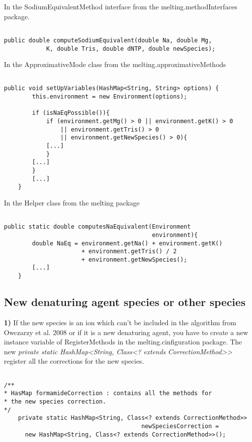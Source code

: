 \documentclass{article}
\begin{document}
In the SodiumEquivalentMethod interface from the melting.methodInterfaces package.
\begin{verbatim}

public double computeSodiumEquivalent(double Na, double Mg, 
            K, double Tris, double dNTP, double newSpecies);

\end{verbatim}

In the ApproximativeMode class from the melting.approximativeMethods
\begin{verbatim}

public void setUpVariables(HashMap<String, String> options) {
		this.environment = new Environment(options);

		if (isNaEqPossible()){
			if (environment.getMg() > 0 || environment.getK() > 0 
			    || environment.getTris() > 0 
			    || environment.getNewSpecies() > 0){
			[...]
			}
		[...]
		}
		[...]
	}

\end{verbatim}

In the Helper class from the melting package
\begin{verbatim}

public static double computesNaEquivalent(Environment 
                                          environment){
		double NaEq = environment.getNa() + environment.getK() 
		              + environment.getTris() / 2 
		              + environment.getNewSpecies();
		[...]
	}

\end{verbatim}

\subsection{New denaturing agent species or other species}

\textbf{1)} If the new species is an ion which can't be included in the algorithm from Owczarzy et al. 2008
or if it is a new denaturing agent, you have to create a new instance variable of RegisterMethods in
the melting.cinfiguration package. The new \textit{private static HashMap<String, Class<? extends CorrectionMethod>>}
register all the corrections for the new species.

\begin{verbatim}

/**
* HasMap formamideCorrection : contains all the methods for 
* the new species correction.
*/
	private static HashMap<String, Class<? extends CorrectionMethod>> 
	                                   newSpeciesCorrection = 
	  new HashMap<String, Class<? extends CorrectionMethod>>();

\end{verbatim}
\end{document}
